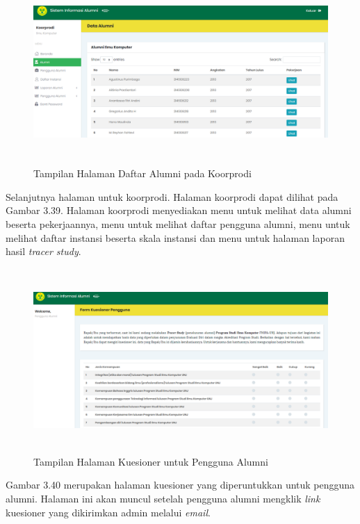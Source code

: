 \begin{figure}[H]
	\centering
	\includegraphics[width=14cm,height=7cm]{gambar/tampilan/koorprodi_daftarAlumni}
	\caption{Tampilan Halaman Daftar Alumni pada Koorprodi }
	\label{ui_koorprodiDaftarAlumni}
\end{figure}

Selanjutnya halaman untuk koorprodi. Halaman koorprodi dapat dilihat pada Gambar 3.39. Halaman koorprodi menyediakan menu untuk melihat data alumni beserta pekerjaannya, menu untuk melihat daftar pengguna alumni, menu untuk melihat daftar instansi beserta skala instansi dan menu untuk halaman laporan hasil \textit{tracer study}. 

\begin{figure}[H]
	\centering
	\includegraphics[width=14cm,height=7cm]{gambar/tampilan/penggunaAlumni_kuesioner}
	\caption{Tampilan Halaman Kuesioner untuk Pengguna Alumni}
	\label{ui_penggunaAlumniKuesioner}
\end{figure}

Gambar 3.40 merupakan halaman kuesioner yang diperuntukkan untuk pengguna alumni. Halaman ini akan muncul setelah pengguna alumni mengklik \textit{link} kuesioner yang dikirimkan admin melalui \textit{email}. 

